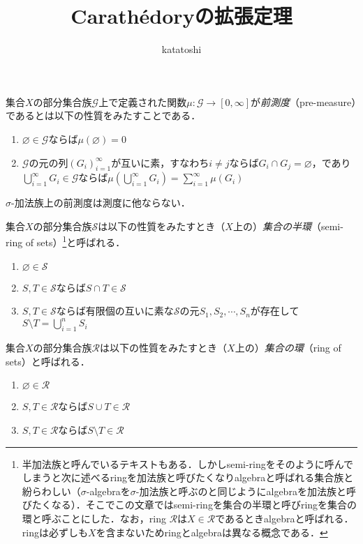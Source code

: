\documentclass[12pt,a4paper]{jsarticle}
\begin{document}
\title{Carath\'{e}doryの拡張定理}
\author{katatoshi}
\maketitle

集合$X$の部分集合族$\mathcal{G}$上で定義された関数$\mu: \mathcal{G} \to [0, \infty]$が\emph{前測度}（pre-measure）であるとは以下の性質をみたすことである．
\begin{enumerate}
    \item $\varnothing \in \mathcal{G}$ならば$\mu(\varnothing) = 0$
    \item $\mathcal{G}$の元の列$(G_i)_{i = 1}^\infty$が互いに素，すなわち$i \not= j$ならば$G_i \cap G_j = \varnothing$，であり$\bigcup_{i = 1}^\infty G_i \in \mathcal{G}$ならば$\mu\left(\bigcup_{i = 1}^\infty G_i\right) = \sum_{i = 1}^\infty \mu(G_i)$
\end{enumerate}
$\sigma$-加法族上の前測度は測度に他ならない．

集合$X$の部分集合族$\mathcal{S}$は以下の性質をみたすとき（$X$上の）\emph{集合の半環}（semi-ring of sets）\footnote{半加法族と呼んでいるテキストもある．しかしsemi-ringをそのように呼んでしまうと次に述べるringを加法族と呼びたくなりalgebraと呼ばれる集合族と紛らわしい（$\sigma$-algebraを$\sigma$-加法族と呼ぶのと同じようにalgebraを加法族と呼びたくなる）．そこでこの文章ではsemi-ringを集合の半環と呼びringを集合の環と呼ぶことにした．なお，ring $\mathcal{R}$は$X \in \mathcal{R}$であるときalgebraと呼ばれる．ringは必ずしも$X$を含まないためringとalgebraは異なる概念である．}と呼ばれる．
\begin{enumerate}
    \item $\varnothing \in \mathcal{S}$
    \item $S, T \in \mathcal{S}$ならば$S \cap T \in \mathcal{S}$
    \item $S, T \in \mathcal{S}$ならば有限個の互いに素な$\mathcal{S}$の元$S_1, S_2, \cdots, S_n$が存在して$S \setminus T = \bigcup_{i = 1}^n S_i$
\end{enumerate}

集合$X$の部分集合族$\mathcal{R}$は以下の性質をみたすとき（$X$上の）\emph{集合の環}（ring of sets）と呼ばれる．
\begin{enumerate}
    \item $\varnothing \in \mathcal{R}$
    \item $S, T \in \mathcal{R}$ならば$S \cup T \in \mathcal{R}$
    \item $S, T \in \mathcal{R}$ならば$S \setminus T \in \mathcal{R}$
\end{enumerate}
\end{document}
